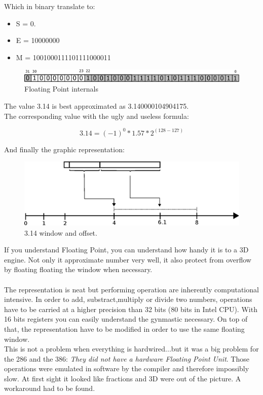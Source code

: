 \documentclass[book.tex]{subfiles}
\begin{document}
Which in binary translate to:

\begin{itemize}
\item S = 0.
\item E = 10000000
\item M = 1001000111101111000011
\end{itemize}

\begin{figure}[H]
\centering
\includegraphics[scale=0.4]{imgs/floating_point_layout_pi.eps}
\caption{Floating Point internals}
\label{fig:fp_internals}
\end{figure}
  \bigskip

The value 3.14 is best approximated as 3.140000104904175.\\

The corresponding value with the ugly and useless formula:

\begin{equation}
3.14 = (-1)^0 * 1.57 * 2^{(128-127)}
\end{equation}

\bigskip

And finally the graphic representation:\\

\begin{figure}[H]
\centering
\includegraphics[scale=0.7]{imgs/floating_point_window.eps}

\caption{3.14 window and offset.}
\label{fig:fp_internals}
\end{figure}
  \bigskip

If you understand Floating Point, you can understand how handy it is to a 3D engine.
Not only it approximate number very well, it also protect from overflow by floating floating the window when necessary.\\
\\
The representation is neat but performing operation are inherently computational intensive. In order to add, substract,multiply or divide two numbers, operations have to be carried at a higher precision than 32 bits (80 bits in Intel CPU). With 16 bits registers you can easily understand the gynmastic necessary. On top of that, the representation have to be modified in order to use the same floating window.
\\
This is not a problem when everything is hardwired...but it was a big problem for the 286 and the 386: \emph{They did not have a hardware Floating Point Unit}. Those operations were emulated in software by the compiler and therefore impossibly slow. At first sight it looked like fractions and 3D were out of the picture. A workaround had to be found.
\end{document}
